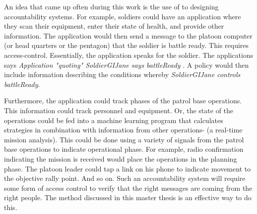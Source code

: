 \documentclass[../../main/main.tex]{subfiles}
\begin{document}
An idea that came up often during this work is the use of  to designing accountability systems. For example, soldiers could have an application where they scan their equipment, enter their state of health, and provide other information.  The application would then send a message to the platoon computer (or head quarters or the pentagon) that the soldier is battle ready.  This requires access-control.  Essentially, the application speaks for the soldier.  The applications says \textit{Application "quoting" SoldierGIJane says battleReady} .  A policy would then include information describing the conditions whereby \textit{SoldierGIJane controls battleReady}. 

Furthermore, the application could track phases of the patrol base operations.  This information could track personnel and equipment.   Or, the state of the operations could be fed into a machine learning program that calculates strategies in combination with information from other operations- (a real-time mission analysis).   This could be done using a variety of signals from the patrol base operations to indicate operational phase. For example, radio confirmation indicating the mission is received would place the operations in the planning phase.  The platoon leader could tap a link on his phone to indicate movement to the objective rally point.  And so on.  Such an accountability system will require some form of access control to verify that the right messages are coming from the right people.  The method discussed in this master thesis is an effective way to do this.
\end{document}
